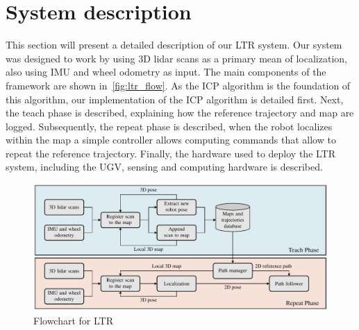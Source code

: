 \section{System description}
\label{sec:sys}

This section will present a detailed description of our \ac{LTR} system.
Our system was designed to work by using 3D lidar scans as a primary mean of localization, also using \ac{IMU} and wheel odometry as input.
The main components of the framework are shown in~\autoref{fig:ltr_flow}.
As the \ac{ICP} algorithm is the foundation of this algorithm, our implementation of the \ac{ICP} algorithm is detailed first.
Next, the teach phase is described, explaining how the reference trajectory and map are logged.
Subsequently, the repeat phase is described, when the robot localizes within the map a simple controller allows computing commands that allow to repeat the reference trajectory.
Finally, the hardware used to deploy the \ac{LTR} system, including the \ac{UGV}, sensing and computing hardware is described.

\begin{figure} [h!]
	\centering
	\includegraphics[width=\linewidth]{figs/Teach_and_repeat_pipeline/teach_and_repeat_pipeline.pdf}
	\caption{Flowchart for LTR}
	\label{fig:ltr_flow}
\end{figure}


